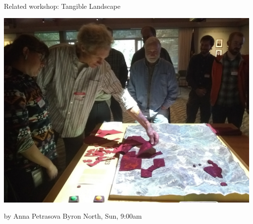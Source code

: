 \documentclass[xcolor={dvipsnames,usenames},beamer,aspectratio=169]{beamer}
\begin{document}
\begin{frame}{Related workshop: Tangible Landscape}

\centering
\includegraphics[height=0.6\textheight]{./images/tangible/sod_workshop}

\Large

by Anna Petrasova
Byron North,
Sun, 9:00am

\end{frame}
\end{document}
